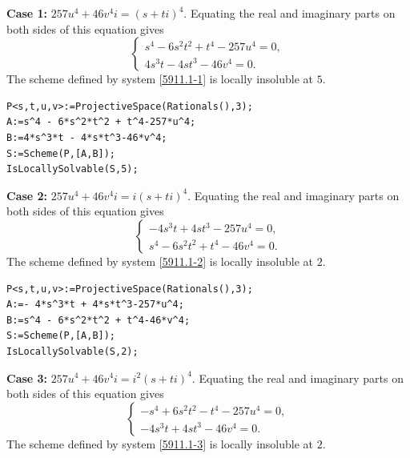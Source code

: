 \documentclass[a4paper,12pt,english,reqno]{amsart}
\begin{document}
{\bf Case 1:} $257u^4+46v^4i=(s+ti)^4$. Equating the real and imaginary parts on both sides of this equation gives
\begin{equation}\label{5911.1-1}
\begin{cases}
s^4 - 6s^2t^2 + t^4 - 257u^4=0,\\
4s^3t - 4st^3 - 46v^4=0.
\end{cases}
\end{equation}
The scheme defined by system \eqref{5911.1-1} is locally insoluble at $5$.
\begin{lstlisting}
P<s,t,u,v>:=ProjectiveSpace(Rationals(),3);
A:=s^4 - 6*s^2*t^2 + t^4-257*u^4;
B:=4*s^3*t - 4*s*t^3-46*v^4;
S:=Scheme(P,[A,B]);
IsLocallySolvable(S,5);
\end{lstlisting}

{\bf Case 2:} $257u^4+46v^4i=i(s+ti)^4$. Equating the real and imaginary parts on both sides of this equation gives
\begin{equation}\label{5911.1-2}
\begin{cases}
-4s^3t + 4st^3 - 257u^4=0,\\
s^4 - 6s^2t^2 + t^4 - 46v^4=0.
\end{cases}
\end{equation}
The scheme defined by system \eqref{5911.1-2} is locally insoluble at $2$.
\begin{lstlisting}
P<s,t,u,v>:=ProjectiveSpace(Rationals(),3);
A:=- 4*s^3*t + 4*s*t^3-257*u^4;
B:=s^4 - 6*s^2*t^2 + t^4-46*v^4;
S:=Scheme(P,[A,B]);
IsLocallySolvable(S,2);
\end{lstlisting}

{\bf Case 3:} $257u^4+46v^4i=i^2(s+ti)^4$. Equating the real and imaginary parts on both sides of this equation gives
\begin{equation}\label{5911.1-3}
\begin{cases}
-s^4 + 6s^2t^2 - t^4 - 257u^4=0,\\
-4s^3t + 4st^3 - 46v^4=0.
\end{cases}
\end{equation}
The scheme defined by system \eqref{5911.1-3} is locally insoluble at $2$.
\end{document}

